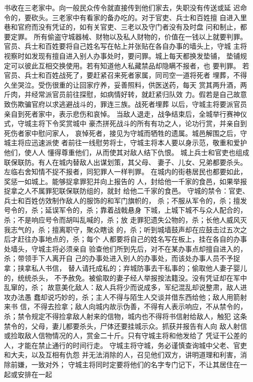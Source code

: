 \documentclass[12pt,UTF8]{ctexbook}
\begin{document}
书收在三老家中。向一般民众传令就直接传到他们家去，失职没有传送或延 
迟命令的，要砍头。三老家中有看家的备办吃的。对于官吏、兵士和百姓擅 
自进入里巷和官府而没有凭证的，如有关官吏、三老以及守门者没有及时盘 
问和制止，都要定罪。 
所有偷盗守城器械、财物以及私人财物的，价值在一钱以上就要判罪。 
官员、兵士和百姓要将自己姓名写在帖上并张贴在各自办事的墙头上，守城 
主将视察时如发现有擅自进入别人办事处时，要问罪。城上每天都换发垫铺， 
垫铺规定可以彼此互相交换使用。若有知道他人私藏禁品却隐瞒不报者，也 
要判罪。 
若官员、兵士和百姓战死了，要赶紧召来死者家属，同司空一道将死者 
埋葬，不得久坐哭泣。受伤很重的让回家疗养，妥善照料，供医送药，每天 
赏其两升酒，两斤肉，并经常派官员前往探慰，如病情好转，就赶紧归队效 
力。假若是自己故意致伤欺骗官府以求逃避战斗的，罪连三族。战死者埋葬 
以后，守城主将要派官员亲自到死者家中，表示悲伤和哀悼。 
当敌人退走，战争结束后，全城举行赛神仪式，守城主将下令奖赏城中 
豪杰拼死战斗的所有有功之人，论功行赏，并亲自到死伤者家中慰问家人， 
哀悼死者，接见为守城而牺牲的遗属。城邑解围之后，守城主将应迅速派使 
者前往一线慰劳将士，守城主将本人要以身示范，敬重和爱护他们，使人人 
懂得尊重他们，从而使其对敌人结下仇恨。 
城上兵士和官吏也组成联保联防。有人在城内替敌人出谋划策，其父母、 
妻子、儿女、兄弟都要杀头。左临右舍知情不捉不报者，同犯罪人一样判罪。 
在城内的街巷居民也都要如此，奖惩一如城上。能够捉拿罪犯并向上报告的 
人，封给他一千家的食邑，如果举报捉拿之人不属罪犯联保联防组的，就封 
给他二千家的食邑。 
守城的禁令：官吏、兵士和百姓仿效制作敌人的服饰的和军门旗帜的， 
杀；不服从军令的，杀；擅发号令的，杀；延误军令的，杀；靠着战戟悬身 
下城，上城下城不与众人配合的，杀；不是响应号令而胡叫乱喊的，杀；放 
走罪犯遗失公物的，杀；长他人威风灭我志气的，杀；擅离职守，聚众瞎谈 
的，杀；听到城墙鼓声却在应鼓击过五次之后才赶往办事地点的，杀；每个 
人都要将自己的姓名写在板上，挂在各自的办事处墙头，守城主将必须亲自 
验查他们所到先后，对不在某办事点却擅自进入的，杀；带领手下人离开自 
己的办事处进入别人的办事处，而该处办事人员不予捉拿；挟拿私人书信， 
替人请托成私的；弃城防事去干私事的；偷取他人妻子婴儿的，统统杀头， 
不予赦免。被偷取的妻子经人举报按法籍没。没有凭证却在军中乱窜的，杀； 
故意美化敌人：敌人兵将少而说成多，军纪混乱却说整肃，敌人进攻办法愚 
蠢却说巧妙的，杀；主人不得与陌生人交谈并借东西给他；敌人用箭射来书 
信，不得去捡拿；敌人向城内故示伪善，不得有人表示响应，不从禁令的， 
杀；禁令规定不得捡拿敌人射来的信物，城内也不得将书信射给敌人，触犯 
这条禁令的，父母，妻儿都要杀头，尸体还要挂城示众。抓获并报告有人向 
敌人射信或捡取敌人信物情况的人，赏金二十斤。只有守城主将和他发给了 
凭证干公差的人，才能在禁止通行的时间行走。 
守城主将守城，务必谨慎查询城中父老、官吏和大夫，以及互相有仇怨 
并无法消除的人，召见他们双方，讲明道理和利害，消除前嫌，一致对外； 
守城主将同时定要将他们的名字专门记下，不让其居住在一起或安排在一起 
\end{document}
